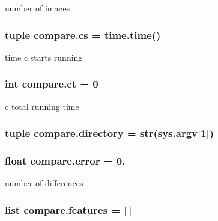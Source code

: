 number of images 

\hypertarget{namespacecompare_a4b1cdf610b8347cc4d994fe187708545}{}
\subsubsection[{cs}]{\setlength{\rightskip}{0pt plus 5cm}tuple compare.\+cs = time.\+time()}\label{namespacecompare_a4b1cdf610b8347cc4d994fe187708545}


time c starts running 

\hypertarget{namespacecompare_a99b344e9432b3e529d933a2b437096a3}{}
\subsubsection[{ct}]{\setlength{\rightskip}{0pt plus 5cm}int compare.\+ct = 0}\label{namespacecompare_a99b344e9432b3e529d933a2b437096a3}


c total running time 

\hypertarget{namespacecompare_a7df7a3d32659e674d401b10b07fbfd4d}{}
\subsubsection[{directory}]{\setlength{\rightskip}{0pt plus 5cm}tuple compare.\+directory = str(sys.\+argv\mbox{[}1\mbox{]})}\label{namespacecompare_a7df7a3d32659e674d401b10b07fbfd4d}
\hypertarget{namespacecompare_afed0a531b3a338fe271715b204fb5d6f}{}
\subsubsection[{error}]{\setlength{\rightskip}{0pt plus 5cm}float compare.\+error = 0.}\label{namespacecompare_afed0a531b3a338fe271715b204fb5d6f}


number of differences 

\hypertarget{namespacecompare_a54c639c8b89bbd55f7362ec8285739bc}{}
\subsubsection[{features}]{\setlength{\rightskip}{0pt plus 5cm}list compare.\+features = \mbox{[}$\,$\mbox{]}}\label{namespacecompare_a54c639c8b89bbd55f7362ec8285739bc}



